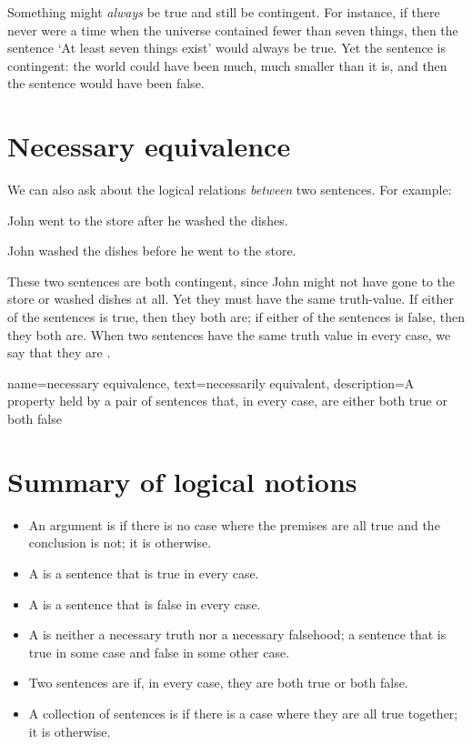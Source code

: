Something might \emph{always} be true and still be contingent. For instance, if there never were a time when the universe contained fewer than seven things, then the sentence `At least seven things exist' would always be true. Yet the sentence is contingent: the world could have been much, much smaller than it is, and then the sentence would have been false. 

\section{Necessary equivalence}

We can also ask about the logical relations \emph{between} two sentences. For example:
\begin{earg}
\item[] John went to the store after he washed the dishes.
\item[] John washed the dishes before he went to the store.
\end{earg}
These two sentences are both contingent, since John might not have gone to the store or washed dishes at all. Yet they must have the same truth-value. If either of the sentences is true, then they both are; if either of the sentences is false, then they both are. When two sentences have the same truth value in every case, we say that they are .

{
name={necessary equivalence},
text={necessarily equivalent},
description={A property held by a pair of sentences that, in every case, are either both true or both false}
}


\section*{Summary of logical notions}

\begin{itemize}
\item An argument is  if there is no case where the premises are all true and the conclusion is not; it is  otherwise.

\item A  is a sentence that is true in every case.

\item A  is a sentence that is false in every case.

\item A  is neither a necessary truth nor a necessary falsehood; a sentence that is true in some case and false in some other case.

\item Two sentences are  if, in every case, they are both true or both false.

\item A collection of sentences is  if there is a case where they are all true together; it is  otherwise.
\end{itemize}


